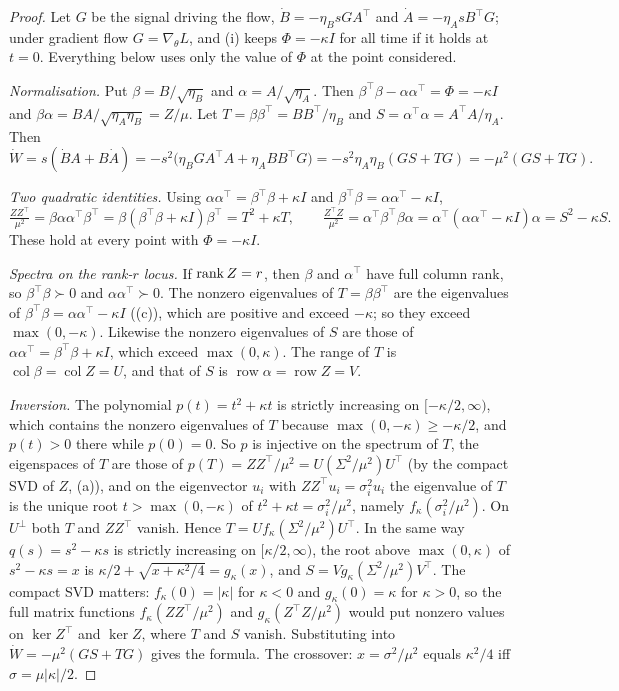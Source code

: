 \begin{proof}
Let $G$ be the signal driving the flow, $\dot B=-\eta_BsGA^\top$ and $\dot A=-\eta_AsB^\top G$; under gradient flow
$G=\nabla_\theta L$, and (i) keeps $\Phi=-\kappa I$ for all time if it holds at $t=0$. Everything
below uses only the value of $\Phi$ at the point considered.

\emph{Normalisation.} Put $\beta=B/\sqrt{\eta_B}$ and $\alpha=A/\sqrt{\eta_A}$. Then
$\beta^\top\beta-\alpha\alpha^\top=\Phi=-\kappa I$ and $\beta\alpha=BA/\sqrt{\eta_A\eta_B}=Z/\mu$. Let
$T=\beta\beta^\top=BB^\top/\eta_B$ and $S=\alpha^\top\alpha=A^\top A/\eta_A$. Then
\[\dot W=s(\dot BA+B\dot A)=-s^2\big(\eta_BGA^\top A+\eta_ABB^\top G\big)=-s^2\eta_A\eta_B(GS+TG)=-\mu^2(GS+TG).\]

\emph{Two quadratic identities.} Using $\alpha\alpha^\top=\beta^\top\beta+\kappa I$ and $\beta^\top\beta=\alpha\alpha^\top-\kappa I$,
\[\tfrac{ZZ^\top}{\mu^2}=\beta\alpha\alpha^\top\beta^\top=\beta(\beta^\top\beta+\kappa I)\beta^\top=T^2+\kappa T,\qquad
\tfrac{Z^\top Z}{\mu^2}=\alpha^\top\beta^\top\beta\alpha=\alpha^\top(\alpha\alpha^\top-\kappa I)\alpha=S^2-\kappa S .\]
These hold at every point with $\Phi=-\kappa I$.

\emph{Spectra on the rank-$r$ locus.} If $\operatorname{rank} Z=r$, then $\beta$ and $\alpha^\top$ have full column rank, so
$\beta^\top\beta\succ0$ and $\alpha\alpha^\top\succ0$. The nonzero eigenvalues of $T=\beta\beta^\top$ are the eigenvalues of
$\beta^\top\beta=\alpha\alpha^\top-\kappa I$ ((c)), which are positive and exceed $-\kappa$; so they exceed $\max(0,-\kappa)$.
Likewise the nonzero eigenvalues of $S$ are those of $\alpha\alpha^\top=\beta^\top\beta+\kappa I$, which exceed $\max(0,\kappa)$.
The range of $T$ is $\operatorname{col}\beta=\operatorname{col}Z=U$, and that of $S$ is $\operatorname{row}\alpha=\operatorname{row}Z=V$.

\emph{Inversion.} The polynomial $p(t)=t^2+\kappa t$ is strictly increasing on $[-\kappa/2,\infty)$, which contains the
nonzero eigenvalues of $T$ because $\max(0,-\kappa)\ge-\kappa/2$, and $p(t)>0$ there while $p(0)=0$. So $p$ is injective
on the spectrum of $T$, the eigenspaces of $T$ are those of $p(T)=ZZ^\top/\mu^2=U(\Sigma^2/\mu^2)U^\top$ (by the compact SVD of $Z$,
(a)), and on the
eigenvector $u_i$ with $ZZ^\top u_i=\sigma_i^2u_i$ the eigenvalue of $T$ is the unique root $t>\max(0,-\kappa)$ of
$t^2+\kappa t=\sigma_i^2/\mu^2$, namely $f_\kappa(\sigma_i^2/\mu^2)$. On $U^\perp$ both $T$ and $ZZ^\top$ vanish. Hence
$T=Uf_\kappa(\Sigma^2/\mu^2)U^\top$. In the same way $q(s)=s^2-\kappa s$ is strictly increasing on $[\kappa/2,\infty)$,
the root above $\max(0,\kappa)$ of $s^2-\kappa s=x$ is $\kappa/2+\sqrt{x+\kappa^2/4}=g_\kappa(x)$, and
$S=Vg_\kappa(\Sigma^2/\mu^2)V^\top$. The compact SVD matters: $f_\kappa(0)=\lvert\kappa\rvert$ for $\kappa<0$ and
$g_\kappa(0)=\kappa$ for $\kappa>0$, so the full matrix functions $f_\kappa(ZZ^\top/\mu^2)$ and
$g_\kappa(Z^\top Z/\mu^2)$ would put nonzero values on $\ker Z^\top$ and $\ker Z$, where $T$ and $S$ vanish. Substituting
into $\dot W=-\mu^2(GS+TG)$ gives the formula. The crossover: $x=\sigma^2/\mu^2$ equals $\kappa^2/4$ iff
$\sigma=\mu\lvert\kappa\rvert/2$.


\end{proof}
